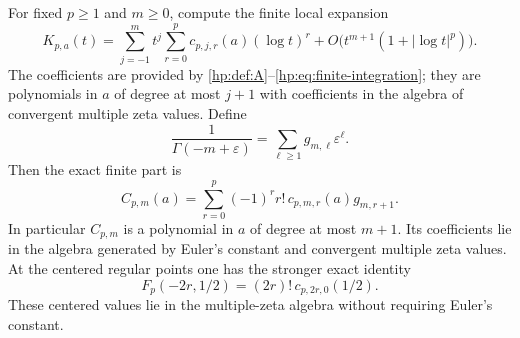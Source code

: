 \begin{theorem}
\label{hp:thm:finiteparts}
For fixed $p\ge1$ and $m\ge0$, compute the finite local expansion
\begin{equation}\label{hp:eq:local-kernel}
 K_{p,a}(t)=\sum_{j=-1}^{m}t^j
         \sum_{r=0}^p c_{p,j,r}(a)(\log t)^r
       +O\bigl(t^{m+1}(1+|\log t|^p)\bigr).
\end{equation}
The coefficients are provided by
\eqref{hp:def:A}--\eqref{hp:eq:finite-integration}; they are polynomials
in $a$ of degree at most $j+1$ with coefficients in the algebra of
convergent multiple zeta values. Define
\begin{equation}\label{hp:def:g}
 \frac1{\Gamma(-m+\varepsilon)}
      =\sum_{\ell\ge1}g_{m,\ell}\varepsilon^\ell.
\end{equation}
Then the exact finite part is
\begin{equation}\label{hp:eq:FP-all}
 \boxed{\quad C_{p,m}(a)=
   \sum_{r=0}^p(-1)^rr!\,c_{p,m,r}(a)g_{m,r+1}.\quad}
\end{equation}
In particular $C_{p,m}$ is a polynomial in $a$ of degree at most
$m+1$. Its coefficients lie in the algebra generated by Euler's
constant and convergent multiple zeta values. At the centered regular
points one has the stronger exact identity
\begin{equation}\label{hp:eq:center-value}
 F_p(-2r,1/2)=(2r)!\,c_{p,2r,0}(1/2).
\end{equation}
These centered values lie in the multiple-zeta algebra without requiring
Euler's constant.
\end{theorem}

